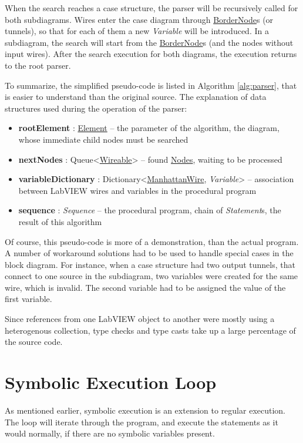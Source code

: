 When the search reaches a case structure, the parser will be recursively called for both subdiagrams. Wires enter the case diagram through \underline{BorderNode}s (or tunnels), so that for each of them a new \textit{Variable} will be introduced. In a subdiagram, the search will start from the \underline{BorderNode}s (and the nodes without input wires). After the search execution for both diagrams, the execution returns to the root parser.

To summarize, the simplified pseudo-code is listed in Algorithm \ref{alg:parser}, that is easier to understand than the original source. 
The explanation of data structures used during the operation of the parser:

\begin{itemize}
\item \textbf{rootElement} : \underline{Element} -- the parameter of the algorithm, the diagram, whose immediate child nodes must be searched
\item \textbf{nextNodes} : Queue<\underline{Wireable}> -- found \underline{Nodes}, waiting to be processed
\item \textbf{variableDictionary} : Dictionary<\underline{ManhattanWire}, \textit{Variable}> -- association between LabVIEW wires and variables in the procedural program
\item \textbf{sequence} : \textit{Sequence} -- the procedural program, chain of \textit{Statement}s, the result of this algorithm
\end{itemize}



Of course, this pseudo-code is more of a demonstration, than the actual program. A number of workaround solutions had to be used to handle special cases in the block diagram. For instance, when a case structure had two output tunnels, that connect to one source in the subdiagram, two variables were created for the same wire, which is invalid. The second variable had to be assigned the value of the first variable.

Since references from one LabVIEW object to another were mostly using a heterogenous collection, type checks and type casts take up a large percentage of the source code.

\section{Symbolic Execution Loop}

As mentioned earlier, symbolic execution is an extension to regular execution. The loop will iterate through the program, and execute the statements as it would normally, if there are no symbolic variables present.


